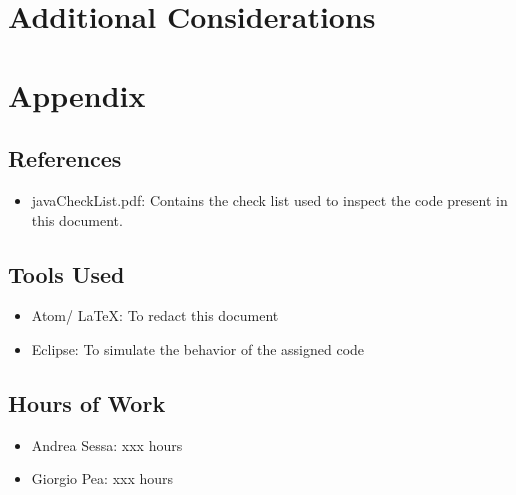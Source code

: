 \documentclass[11pt,titlepage]{article} %
\begin{document}
\section{Additional Considerations}

\newpage
\section{Appendix}
\subsection{References}
   \begin{itemize}
    \item javaCheckList.pdf: Contains the check list used to inspect the code present in this document.
   \end{itemize}
\subsection{Tools Used}
  \begin{itemize}
   \item Atom/ \LaTeX: To redact this document
   \item Eclipse: To simulate the behavior of the assigned code
  \end{itemize}
\subsection{Hours of Work}
  \begin{itemize}
   \item Andrea Sessa: xxx hours
   \item Giorgio Pea: xxx hours
  \end{itemize}
\end{document}
